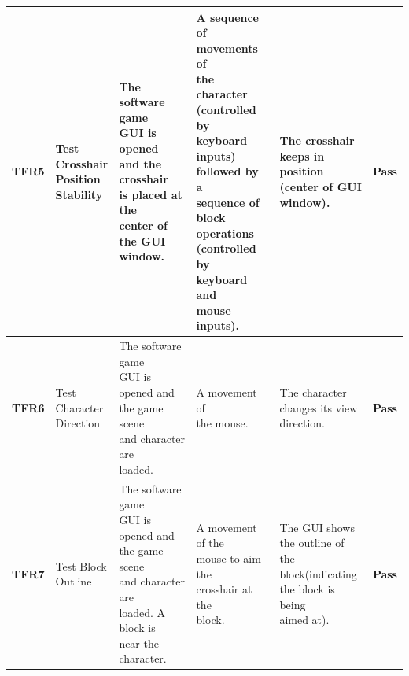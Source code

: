 \documentclass[12pt, titlepage]{article}
\begin{document}
\begin{center}
\begin{longtable}[!bpht]{|m{1.3cm}|m{2.3cm}|m{3.4cm}|m{3.4cm}|m{3.4cm}|m{1cm}|}
\textbf{TFR5} & \makecell[ml]{Test\\ Crosshair\\ Position\\ Stability} & \makecell[ml]{The software game\\ GUI is opened\\ and the crosshair\\ is placed at the\\ center of the GUI\\ window.} & \makecell[ml]{A sequence of\\ movements of\\ the character\\(controlled by\\ keyboard inputs)\\ followed by a\\ sequence of block\\ operations\\(controlled by\\ keyboard and\\ mouse inputs).} & \makecell[ml]{The crosshair\\ keeps in position\\ (center of GUI\\ window).} & \textbf{Pass}\\\hline

\textbf{TFR6} & \makecell[ml]{Test\\ Character\\ Direction} & \makecell[ml]{The software game\\ GUI is opened and\\ the game scene\\ and character are\\ loaded.} & \makecell[ml]{A movement of\\ the mouse.} & \makecell[ml]{The character\\ changes its view\\ direction.} & \textbf{Pass}\\\hline

\textbf{TFR7} & \makecell[ml]{Test Block\\ Outline} & \makecell[ml]{The software game\\ GUI is opened and\\ the game scene\\ and character are\\ loaded. A block is\\ near the character.} & \makecell[ml]{A movement of the\\ mouse to aim the\\ crosshair at the\\ block.} & \makecell[ml]{The GUI shows\\ the outline of the\\ block(indicating\\ the block is being\\ aimed at).} & \textbf{Pass}\\\hline


\end{longtable}
\end{center}
\end{document}
